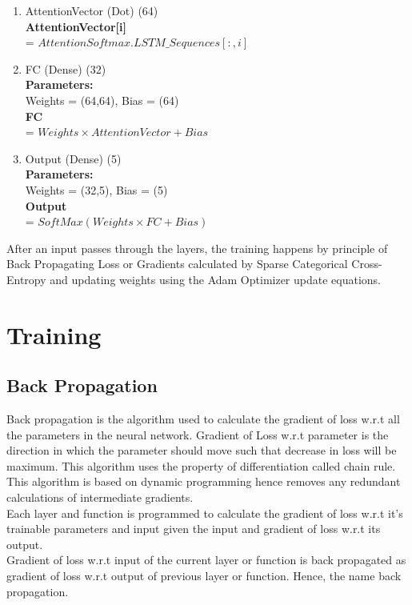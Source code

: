 \documentclass[11pt,english]{article}
\begin{document}
\begin{enumerate}
    \item AttentionVector (Dot)             (64)\\
    \textbf{AttentionVector[i]} \\
    = $AttentionSoftmax . LSTM\_Sequences[:,i]$
    
    \item FC (Dense)                        (32)\\
    \textbf{Parameters:} \\
    Weights = (64,64), Bias = (64)\\     
    \textbf{FC}\\ 
    = $Weights \times AttentionVector + Bias$
    
    \item Output (Dense)                    (5)\\
    \textbf{Parameters:} \\
    Weights = (32,5), Bias = (5)\\
    \textbf{Output} \\
    = $SoftMax(Weights \times FC + Bias)$
    
\end{enumerate}    
After an input passes through the layers, the training happens by principle of Back Propagating Loss or Gradients calculated by Sparse Categorical Cross-Entropy and updating weights using the Adam Optimizer update equations.   

\section{Training}

\subsection{Back Propagation}
Back propagation is the algorithm used to calculate the gradient of loss w.r.t all the parameters in the neural network. Gradient of Loss w.r.t parameter is the direction in which the parameter should move such that decrease in loss will be maximum. This algorithm uses the property of differentiation called chain rule. This algorithm is based on dynamic programming hence removes any redundant calculations of intermediate gradients.\\
Each layer and function is programmed to calculate the gradient of loss w.r.t it's trainable parameters and input given the input and gradient of loss w.r.t its output.\\
Gradient of loss w.r.t input of the current layer or function is back propagated as gradient of loss w.r.t output of previous layer or function. Hence, the name back propagation.
\end{document}
